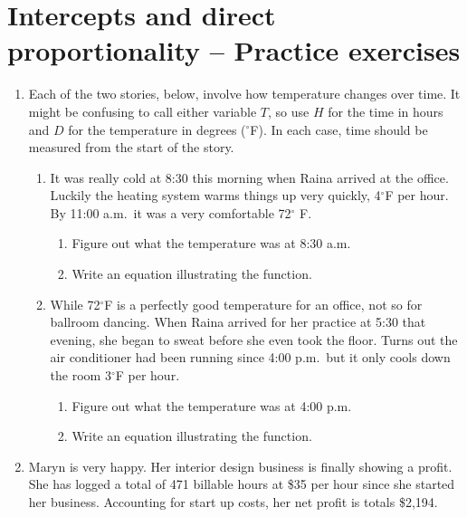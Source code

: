 \section{Intercepts and direct proportionality -- Practice exercises}

\begin{enumerate}

\item Each of the two stories, below, involve how temperature changes over time.  It might be confusing to call either variable $T$, so use $H$ for the time in hours and $D$ for the temperature in degrees ($^{\circ}$F).  In each case, time should be measured from the start of the story.
\begin{enumerate}
\item It was really cold at 8:30 this morning when Raina arrived at the office.  Luckily the heating system warms things up very quickly, 4$^\circ$F per hour.  By 11:00 a.m.\  it was a very comfortable 72$^\circ$ F.
\begin{enumerate}
\item Figure out what the temperature was at 8:30 a.m.  \vfill
\item Write an equation illustrating the function.   \vfill
\end{enumerate}
\item While 72$^\circ$F is a perfectly good temperature for an office, not so for ballroom dancing. When Raina arrived for her practice at 5:30 that evening, she began to sweat before she even took the floor.  Turns out the air conditioner had been running since 4:00 p.m.\ but it only cools down the room 3$^\circ$F per hour.
\begin{enumerate}
\item Figure out what the temperature was at 4:00 p.m.   \vfill
\item Write an equation illustrating the function.   \vfill
\end{enumerate}
\end{enumerate}

\newpage %

\item Maryn is very happy.  Her interior design business is finally showing a profit.  She has logged a total of 471 billable hours at \$35 per hour since she started her business.  Accounting for start up costs, her net profit is totals  \$2,194.


\end{enumerate}
